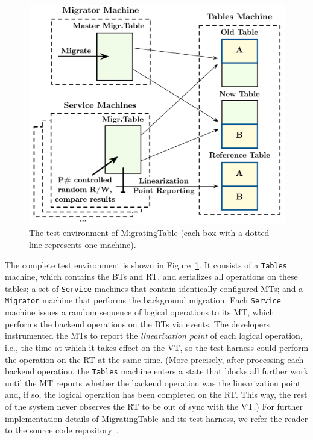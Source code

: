 \begin{figure}[t]
\centering
\includegraphics[width=\linewidth]{img/modeled_migration}
\vspace{-6mm}
\caption{The \psharp test environment of MigratingTable (each box with a dotted line represents one \psharp machine).}
\label{fig:mockedmigration}
\vspace{-2mm}
\end{figure}

The complete test environment is shown in Figure~\ref{fig:mockedmigration}. It consists of a \texttt{Tables} machine, which contains the BTs and RT, and serializes all operations on these tables; a set of \texttt{Service} machines that contain identically configured MTs; and a \texttt{Migrator} machine that performs the background migration. Each \texttt{Service} machine issues a random sequence of logical operations to its MT, which performs the backend operations on the BTs via \psharp events. The developers instrumented the MTs to report the \emph{linearization point} of each logical operation, i.e., the time at which it takes effect on the VT, so the test harness could perform the operation on the RT at the same time. (More precisely, after processing each backend operation, the \texttt{Tables} machine enters a \psharp state that blocks all further work until the MT reports whether the backend operation was the linearization point and, if so, the logical operation has been completed on the RT. This way, the rest of the system never observes the RT to be out of sync with the VT.)
For further implementation details of MigratingTable and its test harness, we refer the reader to the source code repository~\cite{migratingtable-src}.

